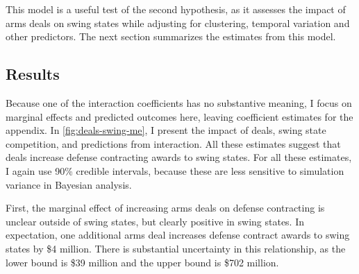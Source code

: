 \documentclass[12pt]{article}
\begin{document}
This model is a useful test of the second hypothesis, as it assesses the impact of arms deals on swing states while adjusting for clustering, temporal variation and other predictors.%
The next section summarizes the estimates from this model. 


\subsection{Results}


Because one of the interaction coefficients has no substantive meaning, I focus on marginal effects and predicted outcomes here, leaving coefficient estimates for the appendix.
In \autoref{fig:deals-swing-me}, I present the impact of deals, swing state competition, and predictions from interaction.
All these estimates suggest that deals increase defense contracting awards to swing states. 
For all these estimates, I again use 90\% credible intervals, because these are less sensitive to simulation variance in Bayesian analysis. 


First, the marginal effect of increasing arms deals on defense contracting is unclear outside of swing states, but clearly positive in swing states. 
In expectation, one additional arms deal increases defense contract awards to swing states by \$4 million. 
There is substantial uncertainty in this relationship, as the lower bound is \$39 million and the upper bound is \$702 million. 
\end{document}

